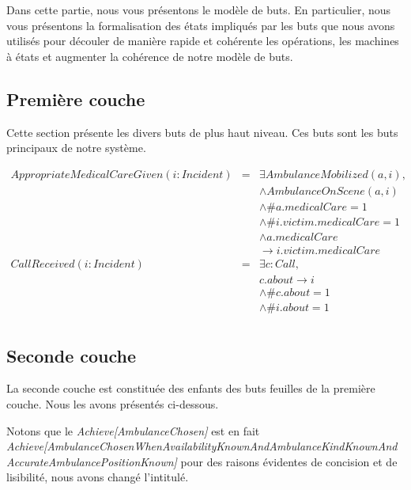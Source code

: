 Dans cette partie, nous vous présentons le modèle de buts. En 
particulier, nous vous présentons la formalisation des états impliqués
par les buts que nous avons
utilisés pour découler de manière rapide et cohérente les opérations, les
machines à états et augmenter la cohérence de notre modèle de buts.

\subsection{Première couche}

	Cette section présente les divers buts de plus haut niveau. Ces buts
	sont les buts principaux de notre système. 

	\singlespacing
	\begin{equation*}
		\begin{array}{rcl}
			AppropriateMedicalCareGiven(i:Incident)
			& = & \exists AmbulanceMobilized(a, i), \\
			&   & \wedge AmbulanceOnScene(a, i) \\
			&   & \wedge \#a.medicalCare = 1 \\
			&   & \wedge \#i.victim.medicalCare = 1 \\
			&   & \wedge a.medicalCare \\
			&   & \rightarrow i.victim.medicalCare \\ 
			CallReceived(i:Incident)
			& = & \exists c: Call, \\
			&   & c.about \rightarrow i \\
			&   & \wedge \#c.about = 1 \\
			&   & \wedge \#i.about = 1 \\
		\end{array}
	\end{equation*}
	\onehalfspacing

\subsection{Seconde couche}
	
	La \og seconde couche \fg est constituée des enfants des buts
	feuilles de la première couche. Nous les avons présentés ci-dessous. 
	
	Notons que le \textit{Achieve[AmbulanceChosen]} est en fait
	\textit{Achieve[\-Ambulance\-Chosen\-When\-Availability\-Known\-And\-Ambulance\-Kind\-Known\-And\-Accurate\-Ambulance\-Position\-Known]}
	pour des raisons évidentes de concision et de lisibilité, nous avons 
	changé l'intitulé.

